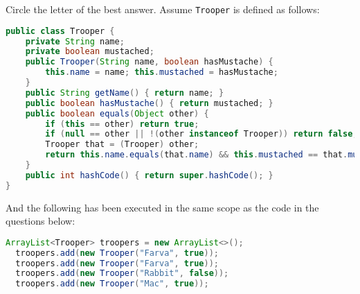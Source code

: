 \documentclass[answers,addpoints,9pt]{exam}
\begin{document}
\begin{questions}
 Circle the letter of the best answer. Assume {\tt Trooper} is defined as follows:
\begin{lstlisting}[language=Java]
public class Trooper {
    private String name;
    private boolean mustached;
    public Trooper(String name, boolean hasMustache) {
        this.name = name; this.mustached = hasMustache;
    }
    public String getName() { return name; }
    public boolean hasMustache() { return mustached; }
    public boolean equals(Object other) {
        if (this == other) return true;
        if (null == other || !(other instanceof Trooper)) return false;
        Trooper that = (Trooper) other;
        return this.name.equals(that.name) && this.mustached == that.mustached;
    }
    public int hashCode() { return super.hashCode(); }
}
\end{lstlisting}
And the following has been executed in the same scope as the code in the questions below:
\begin{lstlisting}[language=Java]
  ArrayList<Trooper> troopers = new ArrayList<>();
  troopers.add(new Trooper("Farva", true));
  troopers.add(new Trooper("Farva", true));
  troopers.add(new Trooper("Rabbit", false));
  troopers.add(new Trooper("Mac", true));
\end{lstlisting}

\end{questions}
\end{document}
